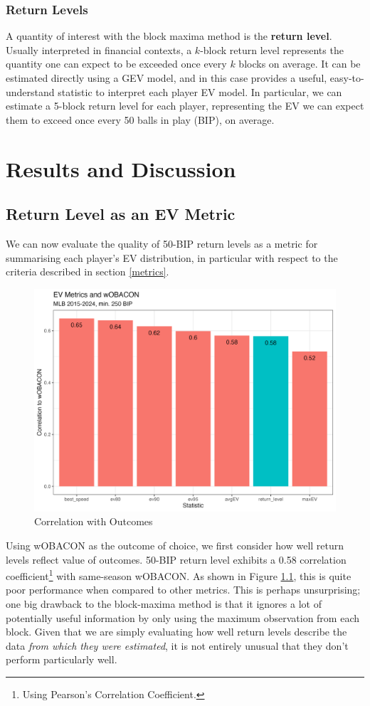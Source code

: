 \documentclass[12pt, TexShade, letterpaper]{report}
\begin{document}
\subsection{Return Levels}
A quantity of interest with the block maxima method is the \textbf{return level}. Usually interpreted in financial contexts, a $k$-block return level represents the quantity one can expect to be exceeded once every $k$ blocks on average. It can be estimated directly using a GEV model, and in this case provides a useful, easy-to-understand statistic to interpret each player EV model. In particular, we can estimate a 5-block return level for each player, representing the EV we can expect them to exceed once every 50 balls in play (BIP), on average.

\chapter{Results and Discussion}\label{ch:results}
\section{Return Level as an EV Metric}
We can now evaluate the quality of 50-BIP return levels as a metric for summarising each player's EV distribution, in particular with respect to the criteria described in section \ref{metrics}.

\begin{figure}[ht]
    \centering
    \includegraphics[width=0.85\linewidth]{plots/woba_correlation.png}
    \caption{Correlation with Outcomes}
    \label{fig:corr-outcomes}
\end{figure}

Using wOBACON as the outcome of choice, we first consider how well return levels reflect value of outcomes. 50-BIP return level exhibits a 0.58 correlation coefficient\footnote{Using Pearson's Correlation Coefficient.} with same-season wOBACON. As shown in Figure \ref{fig:corr-outcomes}, this is quite poor performance when compared to other metrics. This is perhaps unsurprising; one big drawback to the block-maxima method is that it ignores a lot of potentially useful information by only using the maximum observation from each block. Given that we are simply evaluating how well return levels describe the data \textit{from which they were estimated}, it is not entirely unusual that they don't perform particularly well.
\end{document}
